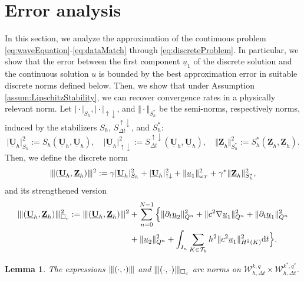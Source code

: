 \documentclass[sn-mathphys-num]{sn-jnl}
\newtheorem{lem}[thm]{Lemma}
\numberwithin{equation}{section}
\newcommand{\wop}{\square_c}
\newcommand{\tnorm}[1]{\vert\hspace{-0.3mm}\Vert#1\Vert\hspace{-0.3mm}\vert}
\newcommand{\dT}{\mathrm{d}t}
\newcommand{\ProdFullyDiscrSpace}[2]{ \mathcal{W}^{ {#1},{#2}}_{h, \Delta t  } }
\newcommand{\Uh}{\underline{\mathbf{U}}_h}
\newcommand{\Zh}{\underline{\mathbf{Z}}_h}
\newcommand{\ul}{\underline{u}}
\newcommand{\Sud}{S^{\uparrow \downarrow}_{\Delta t}}
\newcommand{\dt}{\partial_t}
\begin{document}
\section{Error analysis}
\noindent In this section, we analyze the approximation of the continuous problem \eqref{eq:waveEquation}-\eqref{eq:dataMatch} through \eqref{eq:discreteProblem}. In particular, we show that the error between the first component $\ul_1$ of the discrete solution and the continuous solution $u$ is bounded by the best approximation error in suitable discrete norms defined below. Then, we show that under Assumption \ref{assum:LipschitzStability}, we can recover convergence rates in a physically relevant norm.
Let $\vert \cdot \vert_{S_h}, \vert \cdot \vert_{\uparrow \downarrow}$, and $\Vert \cdot \Vert_{S_h^{\ast}}$ be the semi-norms, respectively norms, induced by the stabilizers $S_h$, $\Sud$, and $S_h^{\ast}$:
\begin{equation}
    \vert \Uh \vert^2_{S_h} := S_h(\Uh,\Uh), \quad \vert \Uh \vert^2_{\uparrow \downarrow} := \Sud(\Uh,\Uh), \quad \Vert \Zh \Vert^2_{S_h^{\ast}} := S_h^{\ast}(\Zh,\Zh).
\end{equation}
\noindent Then, we define the discrete norm 
\begin{equation}
    \tnorm{ (\Uh,\Zh) }^2 := \gamma \vert \Uh \vert^2_{S_h} + \vert \Uh \vert^2_{\uparrow \downarrow} + \Vert \ul_1 \Vert^2_{\omega_T} + \gamma^{\ast} \Vert \Zh \Vert^2_{S_h^\ast},
\end{equation}
and its strengthened version
\begin{equation}\label{eq:tnormwop}
    \begin{aligned}
        \tnorm{(\Uh, \Zh)}^2_{\wop} := \tnorm{(\Uh, \Zh)}^2 &+ \sum_{n = 0}^{N -1} \Big\{ \Vert \dt \ul_2 \Vert^2_{Q^n} + \Vert c^2 \nabla \ul_1 \Vert^2_{Q^n} + \Vert \dt \ul_1 \Vert^2_{Q^n} \\
        &+ \Vert \ul_2 \Vert^2_{Q^n} + \int_{I_n} \sum_{K \in \mathcal{T}_h} h^2 \Vert c^2 \ul_1 \Vert^2_{H^2(K)} \dT \Big\}. 
    \end{aligned}
\end{equation}

\begin{lem}
    The expressions $\tnorm{(\cdot,\cdot)}$ and $\tnorm{(\cdot,\cdot)}_{\wop}$ are norms on $\ProdFullyDiscrSpace{k}{q} \times \ProdFullyDiscrSpace{k^\ast}{q^\ast}$.  
\end{lem}
\end{document}
